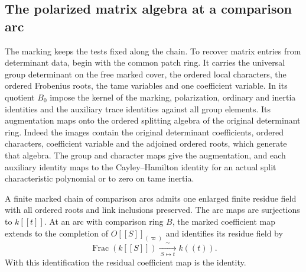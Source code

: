 \subsection{The polarized matrix algebra at a comparison arc}
\label{sec:patching-matrices}
\hypertarget{source-ordinary-patching-matrices}{}

The marking keeps the tests fixed along the chain. To recover matrix entries from
determinant data, begin with the common patch ring. It carries the universal group determinant on the
free marked cover, the ordered local characters, the ordered
Frobenius roots, the tame variables and one coefficient variable.
In its quotient \(B_0\) impose the kernel of the marking, polarization,
ordinary and inertia identities and the auxiliary trace identities against
all group elements. Its augmentation maps onto the ordered splitting
algebra of the original determinant ring. Indeed the images contain the
original determinant coefficients, ordered characters, coefficient
variable and the adjoined ordered roots, which generate that algebra.
The group and character maps give the augmentation, and each auxiliary
identity maps to the Cayley--Hamilton identity for an actual split
characteristic polynomial or to zero on tame inertia.

\begin{lemma}\label{lem:common-marked-coefficients}
A finite marked chain of comparison arcs admits one enlarged
finite residue field with all ordered roots and link
inclusions preserved. The arc maps are surjections to
\(k[[t]]\). At an arc with comparison ring \(B\), the marked
coefficient map extends to the completion of
\(O[[S]]_{(\varpi)}\) and identifies its residue field by
\[
 \operatorname{Frac}(k[[S]])\xrightarrow[\ S\mapsto t\ ]{\ \sim\ } k((t)).
\]
With this identification the residual coefficient map is the identity.
\end{lemma}

